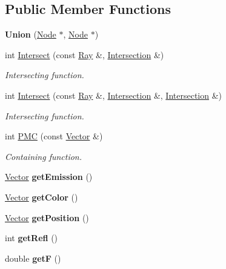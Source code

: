 \subsection*{\-Public \-Member \-Functions}
\begin{DoxyCompactItemize}
\item 
\hypertarget{class_union_aa5437274642585a29ae3de688d13d854}{
{\bfseries \-Union} (\hyperlink{class_node}{\-Node} $\ast$, \hyperlink{class_node}{\-Node} $\ast$)}
\label{class_union_aa5437274642585a29ae3de688d13d854}

\item 
int \hyperlink{class_union_afa492095314d22df3372b4b1a3efaeca}{\-Intersect} (const \hyperlink{class_ray}{\-Ray} \&, \hyperlink{class_intersection}{\-Intersection} \&)
\begin{DoxyCompactList}\small\item\em \-Intersecting function. \end{DoxyCompactList}\item 
int \hyperlink{class_union_a2ecdc6c70bd44426bc20d88885ec497f}{\-Intersect} (const \hyperlink{class_ray}{\-Ray} \&, \hyperlink{class_intersection}{\-Intersection} \&, \hyperlink{class_intersection}{\-Intersection} \&)
\begin{DoxyCompactList}\small\item\em \-Intersecting function. \end{DoxyCompactList}\item 
int \hyperlink{class_union_ae9430083fcfdc62199b26db6e511d150}{\-P\-M\-C} (const \hyperlink{class_vector}{\-Vector} \&)
\begin{DoxyCompactList}\small\item\em \-Containing function. \end{DoxyCompactList}\item 
\hypertarget{class_union_aa6784389abd98cb2695dd19013b3fd5d}{
\hyperlink{class_vector}{\-Vector} {\bfseries get\-Emission} ()}
\label{class_union_aa6784389abd98cb2695dd19013b3fd5d}

\item 
\hypertarget{class_union_a3960fc7e0d24a0e67fc936d31339c42f}{
\hyperlink{class_vector}{\-Vector} {\bfseries get\-Color} ()}
\label{class_union_a3960fc7e0d24a0e67fc936d31339c42f}

\item 
\hypertarget{class_union_ae42e6df118a33668b35837f58069d269}{
\hyperlink{class_vector}{\-Vector} {\bfseries get\-Position} ()}
\label{class_union_ae42e6df118a33668b35837f58069d269}

\item 
\hypertarget{class_union_ab5d1751fa3af64b7804db79f4e5e3413}{
int {\bfseries get\-Refl} ()}
\label{class_union_ab5d1751fa3af64b7804db79f4e5e3413}

\item 
\hypertarget{class_union_a7ba79196a182f3ed1dfc50607000d1cc}{
double {\bfseries get\-F} ()}
\label{class_union_a7ba79196a182f3ed1dfc50607000d1cc}

\end{DoxyCompactItemize}


